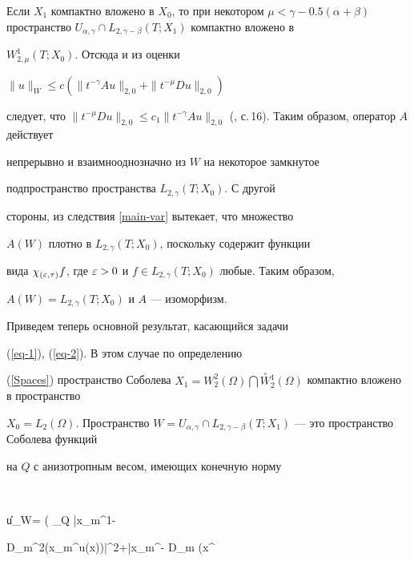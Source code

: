 \begin{pf}


Если $X_1$ компактно вложено в $X_0$, то при некотором $\mu {<}


\gamma -0.5(\alpha{+}\beta)$ пространство $U_{\alpha,\gamma} \cap




L_{2,\gamma-\beta}(T;X_1)$ компактно вложено в


$W_{2,\mu}^1(T;X_0)$. Отсюда и из оценки


$\|u\|_W \le c(\|t^{-\gamma}A u\|_{2,0}+\|t^{-\mu}D u \|_{2,0})$


следует, что $\|t^{-\mu}D u \|_{2,0}\le c_1 \|t^{-\gamma}A


u\|_{2,0}$ (\cite{IzVuz-02}, с.\,16). Таким образом, оператор $A$ действует


непрерывно и взаимнооднозначно из $W$ на некоторое замкнутое


подпространство пространства $L_{2,\gamma}(T;X_0)$. С другой


стороны, из следствия \ref{main-var} вытекает, что множество


$A(W)$ плотно в $L_{2,\gamma}(T;X_0)$, поскольку содержит функции


вида $\chi_{(\eps,\tau)}f$, где $\eps >0$ и $f \in


L_{2,\gamma}(T;X_0)$ любые. Таким образом,


$A(W)=L_{2,\gamma}(T;X_0)$ и $A$ --- изоморфизм.


\end{pf}





Приведем теперь основной результат, касающийся задачи


(\ref{eq-1}), (\ref{eq-2}). В этом случае по определению


(\ref{Spaces}) пространство Соболева $X_1=W^2_2(\Omega) \bigcap


\overset{\circ}{W}{}^1_2(\Omega)$ компактно вложено в пространство


$X_0=L_2(\Omega)$. Пространство $W=U_{\alpha,\gamma} \cap


L_{2,\gamma-\beta}(T;X_1)$ --- это пространство Соболева функций


на $Q$ с анизотропным весом, имеющих конечную норму


$$


\|u\|_W= \bigg( \int_Q |x_m^{1-\gamma}


D_m^2(x_m^{}u(x))|^2+|x_m^{-\gamma} D_m (x^{}


